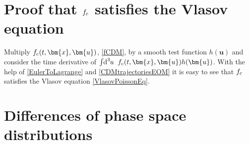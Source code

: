 \documentclass[twocolumn, nofootinbib, showpacs, superscriptaddress]{revtex4-1}
\renewcommand{\c}[0]{{\rm{c}}}
\newcommand{\vol}[2]{\hspace{-0.8mm}\mbox{$\text{d}^{\hspace{-0.0mm}#1}$}\hspace{-0.2mm}#2\hspace{0.8mm}\ }
\newcommand{\vx}[0]{\bm{x} }
\newcommand{\vu}[0]{\bm{u} }
\begin{document}
\section{Proof that $f_\c$ satisfies the Vlasov equation}
\label{sec:CDMsolvesVlasovProof}
Multiply $f_\c(t,\vx,\vu)$,  \eqref{fCDM}, by a smooth test function $h(\vu)$ and consider the time derivative of $\int \vol{3}{u} f_\c(t,\vx,\vu) h(\vu)$. 
With the help of \eqref{EulerToLagrange} and \eqref{CDMtrajectoriesEOM} it is easy to see  that $f_\c$ satisfies the Vlasov equation \eqref{VlasovPoissonEq}.

 \section{Differences of phase space distributions}
 \label{Diffoffs}
 \begin{widetext}
 

\end{widetext}
\end{document}
